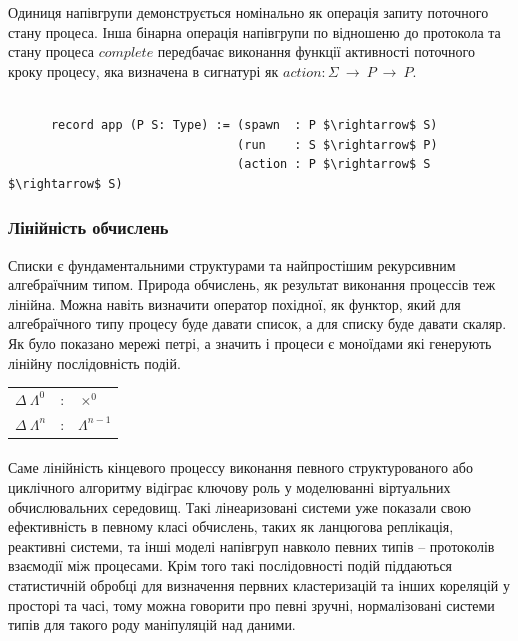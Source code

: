 \documentclass[11pt,oneside]{article}
\begin{document}
  Одиниця напівгрупи
  демонструється номінально як операція запиту поточного стану процеса.
  Інша бінарна операція напівгрупи по відношеню до протокола та стану процеса $complete$
  передбачає виконання функції активності поточного кроку процесу, яка
  визначена в сигнатурі як $action: \Sigma\ \rightarrow\ P\ \rightarrow\ P$.

\begin{center}
\begin{lstlisting}[mathescape=true]

      record app (P S: Type) := (spawn  : P $\rightarrow$ S)
                                (run    : S $\rightarrow$ P)
                                (action : P $\rightarrow$ S $\rightarrow$ S)

\end{lstlisting}
\end{center}

  \subsubsection*{Лінійність обчислень}

   Списки
   є фундаментальними структурами та найпростішим рекурсивним алгебраїчним типом.
   Природа обчислень, як результат виконання процессів теж лінійна. Можна навіть визначити
   оператор похідної, як функтор, який для алгебраїчного типу процесу буде давати список,
   а для списку буде давати скаляр. Як було показано \cite{meseguer} мережі петрі,
   а значить і процеси є моноїдами які генерують лінійну послідовність подій.


\begin{center}
\begin{tabular}{lcl}
$\Delta \ \Lambda^0$         &:& $\times^0$ \\
$\Delta \ \Lambda^{n}$       &:& $\Lambda^{n-1}$ \\
\end{tabular}
\end{center}

   \paragraph{}
   Саме лінійність кінцевого
   процессу виконання певного структурованого або циклічного алгоритму відіграє ключову
   роль у моделюванні віртуальних обчислювальних середовищ. Такі лінеаризовані системи
   уже показали свою ефективність в певному класі обчислень, таких як ланцюгова реплікація,
   реактивні системи, та інші моделі напівгруп навколо певних типів -- протоколів взаємодії між процесами.
   Крім того такі послідовності подій піддаються статистичній обробці для визначення первних кластеризацій
   та інших кореляцій у просторі та часі, тому можна говорити про певні зручні, нормалізовані системи типів для
   такого роду маніпуляцій над даними.
\end{document}

